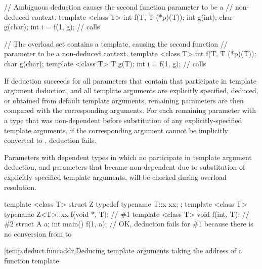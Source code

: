 \pnum
\begin{example}
\begin{codeblock}
// Ambiguous deduction causes the second function parameter to be a
// non-deduced context.
template <class T> int f(T, T (*p)(T));
int g(int);
char g(char);
int i = f(1, g);    // calls 
\end{codeblock}
\end{example}

\pnum
\begin{example}
\begin{codeblock}
// The overload set contains a template, causing the second function
// parameter to be a non-deduced context.
template <class T> int f(T, T (*p)(T));
char g(char);
template <class T> T g(T);
int i = f(1, g);    // calls 
\end{codeblock}
\end{example}

\pnum
If deduction succeeds for all parameters that contain
 that participate in template argument
deduction, and all template arguments are explicitly specified, deduced,
or obtained from default template arguments, remaining parameters are then
compared with the corresponding arguments. For each remaining parameter
 with a type that was non-dependent before substitution of any
explicitly-specified template arguments, if the corresponding argument
 cannot be implicitly converted to , deduction fails.
\begin{note}
Parameters with dependent types in which no 
participate in template argument deduction, and parameters that became
non-dependent due to substitution of explicitly-specified template arguments,
will be checked during overload resolution.
\end{note}
\begin{example}
\begin{codeblock}
  template <class T> struct Z {
    typedef typename T::x xx;
  };
  template <class T> typename Z<T>::xx f(void *, T); // \#1
  template <class T> void f(int, T);                 // \#2
  struct A {} a;
  int main() {
    f(1, a);       // OK, deduction fails for \#1 because there is no conversion from  to 
  }
\end{codeblock}
\end{example}

[temp.deduct.funcaddr]{Deducing template arguments taking the address of a function template}

